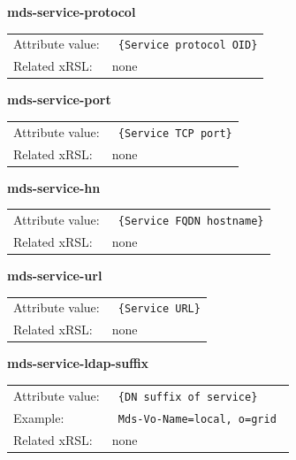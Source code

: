 \documentclass{article}
\begin{document}
  \hspace*{0.5cm}
  \begin{shaded}
    \textbf{mds-service-protocol}
  \end{shaded}
  \begin{tabular}{lp{10cm}}  
    Attribute value:&\verb# {Service protocol OID}#\\
    Related xRSL:&none \\
  \end{tabular}

  \hspace*{0.5cm}
  \begin{shaded}
    \textbf{mds-service-port}
  \end{shaded}
  \begin{tabular}{lp{10cm}}  
    Attribute value:&\verb# {Service TCP port}#\\
    Related xRSL:&none \\
  \end{tabular}

  \hspace*{0.5cm}
  \begin{shaded}
    \textbf{mds-service-hn}
  \end{shaded}
  \begin{tabular}{lp{10cm}}  
    Attribute value:&\verb# {Service FQDN hostname}#\\
    Related xRSL:&none \\
  \end{tabular}

  \hspace*{0.5cm}
  \begin{shaded}
    \textbf{mds-service-url}
  \end{shaded}
  \begin{tabular}{lp{10cm}}  
    Attribute value:&\verb# {Service URL}#\\
    Related xRSL:&none \\
  \end{tabular}

  \hspace*{0.5cm}
  \begin{shaded}
    \textbf{mds-service-ldap-suffix}
  \end{shaded}
  \begin{tabular}{lp{10cm}}  
    Attribute value:&\verb# {DN suffix of service}#\\
    Example: &\verb# Mds-Vo-Name=local, o=grid #\\
    Related xRSL:&none \\
  \end{tabular}
\end{document}
